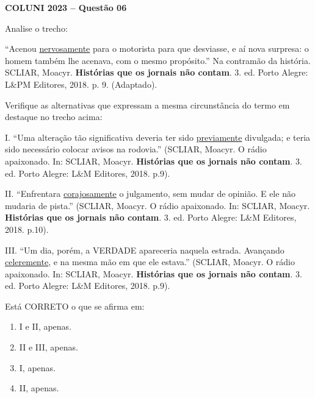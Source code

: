\textbf{COLUNI 2023 -- Questão 06}\par\medskip Analise o trecho:

\par

“Acenou \underline{nervosamente} para o motorista para que desviasse, e aí nova surpresa: o homem também lhe acenava, com o mesmo propósito.” Na contramão da história. SCLIAR, Moacyr. \textbf{Histórias que os jornais não contam}. 3. ed. Porto Alegre: L\&PM Editores, 2018. p. 9. (Adaptado).

\par

Verifique as alternativas que expressam a mesma circunstância do termo em destaque no trecho acima:

\par

I.     “Uma alteração tão significativa deveria ter sido \underline{previamente} divulgada; e teria sido necessário colocar avisos na rodovia.” (SCLIAR, Moacyr. O rádio apaixonado. In: SCLIAR, Moacyr. \textbf{Histórias que os jornais não contam}. 3. ed. Porto Alegre: L\&M Editores, 2018. p.9).\par
II. “Enfrentara \underline{corajosamente} o julgamento, sem mudar de opinião. E ele não mudaria de pista.” (SCLIAR, Moacyr. O rádio apaixonado. In: SCLIAR, Moacyr. \textbf{Histórias que os jornais não contam}. 3. ed. Porto Alegre: L\&M Editores, 2018. p.10).\par
III. “Um dia, porém, a VERDADE apareceria naquela estrada. Avançando \underline{celeremente}, e na mesma mão em que ele estava.” (SCLIAR, Moacyr. O rádio apaixonado. In: SCLIAR, Moacyr. \textbf{Histórias que os jornais não contam}. 3. ed. Porto Alegre: L\&M Editores, 2018. p.9).

\par

Está CORRETO o que se afirma em:\begin{enumerate}
\item I e II, apenas.
\item II e III, apenas.
\item I, apenas.
\item II, apenas.\end{enumerate}
